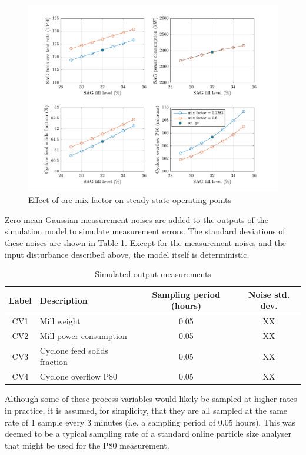 \begin{figure}[htp]
	\centering
	\includegraphics[width=15cm]{images/grind_sim_ss_plot2.pdf}
	\caption{Effect of ore mix factor on steady-state operating points}
	\label{fig:grind_sim_ss_plot2}
\end{figure}

Zero-mean Gaussian measurement noises are added to the outputs of the simulation model to simulate measurement errors. The standard deviations of these noises are shown in Table \ref{tb:meas-noise}. Except for the measurement noises and the input disturbance described above, the model itself is deterministic.


\begin{table}[h!]
	\centering
	\caption{Simulated output measurements} \label{tb:meas-noise}
	\begin{tabular}{c >{\raggedright}p{5.5cm} c c}
		Label & Description & Sampling period (hours) & Noise std. dev. \\
		\midrule
		CV1        & Mill weight & 0.05 & XX \\ 
		CV2       & Mill power consumption & 0.05 & XX \\ 
		CV3       & Cyclone feed solids fraction & 0.05 & XX \\ 
		CV4       & Cyclone overflow P80 & 0.05 & XX \\ 
		\bottomrule
	\end{tabular}
\end{table}


Although some of these process variables would likely be sampled at higher rates in practice, it is assumed, for simplicity, that they are all sampled at the same rate of 1 sample every 3 minutes (i.e. a sampling period of 0.05 hours). This was deemed to be a typical sampling rate of a standard online particle size analyser that might be used for the P80 measurement.


